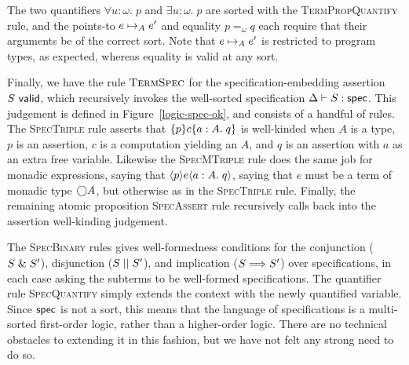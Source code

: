 The two quantifiers $\forall u:\omega.\;p$ and $\exists u:\omega.\;p$
are sorted with the \textsc{TermPropQuantify} rule, and the points-to
$e \mapsto_A e'$ and equality $p =_\omega q$ each require that their 
arguments be of the correct sort. Note that $e \mapsto_A e'$ is
restricted to program types, as expected, whereas equality is valid
at any sort. 

Finally, we have the rule $\textsc{TermSpec}$ for the
specification-embedding assertion ${S}\mbox{\textsf{{ valid}}}$, which recursively
invokes the well-sorted specification ${\Delta} \vdash {S} : \mbox{\textsf{{spec}}}$. This judgement is
defined in Figure~\ref{logic-spec-ok}, and consists of a handful of
rules. The \textsc{SpecTriple} rule asserts that $\{{p}\}{c}\{{a:A}.\;{q}\}$
is well-kinded when $A$ is a type, $p$ is an assertion, $c$ is a
computation yielding an $A$, and $q$ is an assertion with $a$ as an
extra free variable.  Likewise the \textsc{SpecMTriple} rule does the
same job for monadic expressions, saying that $\langle{p}\rangle{e}\langle{a:A}.\;{q}\rangle$,
saying that $e$ must be a term of monadic type $\bigcirc{A}$, but
otherwise as in the \textsc{SpecTriple} rule.  Finally, the remaining
atomic proposition \textsc{SpecAssert} rule recursively calls back into the
assertion well-kinding judgement.




The \textsc{SpecBinary} rules gives well-formedness conditions for the
conjunction ($S \;\&\; S'$), disjunction ($S \;||\; S'$), and
implication ($S \Longrightarrow S'$) over specifications, in each case asking
the subterms to be well-formed specifications. The quantifier rule
\textsc{SpecQuantify} simply extends the context with the newly
quantified variable. Since $\mbox{\textsf{{spec}}}$ is not a sort, this means that
the language of specifications is a multi-sorted first-order logic,
rather than a higher-order logic. There are no technical obstacles to
extending it in this fashion, but we have not felt any strong need to
do so.



